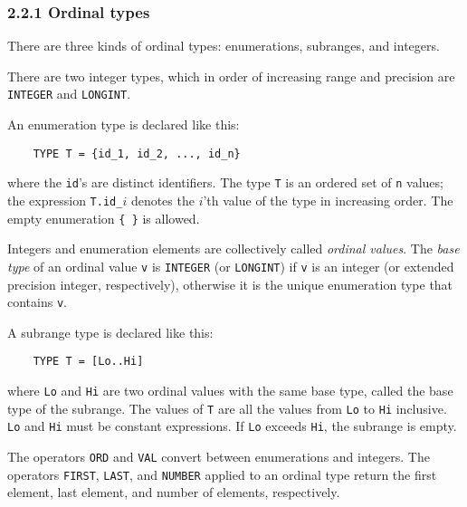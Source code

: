 \documentclass[10pt]{article}
\begin{document}
\subsubsection*{2.2.1 Ordinal types}

There are three kinds of ordinal types: enumerations, subranges, and integers.

There are two integer types, which in order of increasing range and precision
are \verb|INTEGER| and \verb|LONGINT|.

An enumeration type is declared like this:
\begin{verbatim}
    TYPE T = {id_1, id_2, ..., id_n}
\end{verbatim}
where the \verb|id|'s are distinct identifiers.  The type \verb|T| is an
ordered set of \verb|n| values; the expression \verb|T.id_|$i$ denotes the
$i$'th value of the type in increasing order.  The empty enumeration
\verb|{ }| is allowed.

Integers and enumeration elements are collectively called \emph{ordinal
  values}.  The \emph{base type} of an ordinal value \verb|v| is
\verb|INTEGER| (or \verb|LONGINT|) if \verb|v| is an integer (or extended
precision integer, respectively), otherwise it is the unique enumeration type
that contains \verb|v|.

A subrange type is declared like this:
\begin{verbatim}
    TYPE T = [Lo..Hi]
\end{verbatim}
where \verb|Lo| and \verb|Hi| are two ordinal values with the same base type,
called the base type of the subrange.  The values of \verb|T| are all the
values from \verb|Lo| to \verb|Hi| inclusive.  \verb|Lo| and \verb|Hi| must be
constant expressions.  If \verb|Lo| exceeds \verb|Hi|, the subrange is empty.

The operators \verb|ORD| and \verb|VAL| convert between enumerations and
integers.  The operators \verb|FIRST|, \verb|LAST|, and \verb|NUMBER| applied
to an ordinal type return the first element, last element, and number of
elements, respectively.
\end{document}
